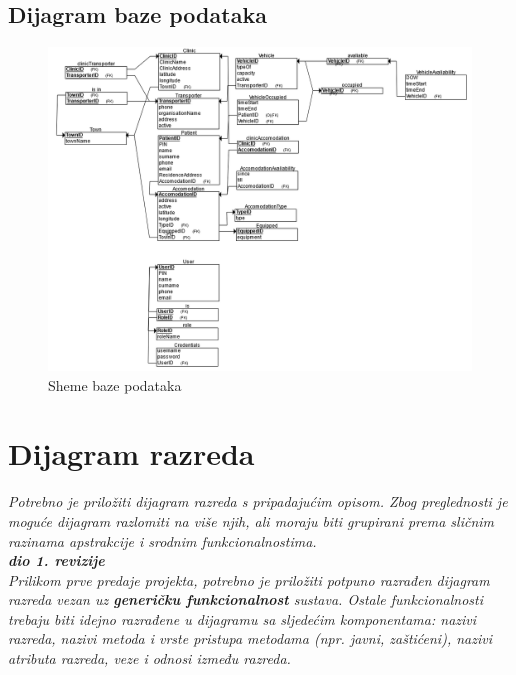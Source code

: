 			\subsection{Dijagram baze podataka}
				\begin{figure}[H]
					\includegraphics[width=\textwidth]{slike/DB_shema.PNG} %
					\caption{Sheme baze podataka}
					\label{fig:db_scheme} %
				\end{figure}
			\eject
			
			
		\section{Dijagram razreda}
		
			\textit{Potrebno je priložiti dijagram razreda s pripadajućim opisom. Zbog preglednosti je moguće dijagram razlomiti na više njih, ali moraju biti grupirani prema sličnim razinama apstrakcije i srodnim funkcionalnostima.}\\
			
			\textbf{\textit{dio 1. revizije}}\\
			
			\textit{Prilikom prve predaje projekta, potrebno je priložiti potpuno razrađen dijagram razreda vezan uz \textbf{generičku funkcionalnost} sustava. Ostale funkcionalnosti trebaju biti idejno razrađene u dijagramu sa sljedećim komponentama: nazivi razreda, nazivi metoda i vrste pristupa metodama (npr. javni, zaštićeni), nazivi atributa razreda, veze i odnosi između razreda.}\\
			
